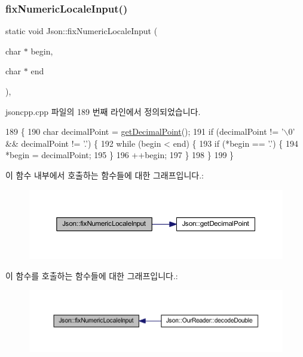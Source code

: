 \subsubsection{\texorpdfstring{fix\+Numeric\+Locale\+Input()}{fixNumericLocaleInput()}}
{\footnotesize\ttfamily static void Json\+::fix\+Numeric\+Locale\+Input (\begin{DoxyParamCaption}\item[{char $\ast$}]{begin,  }\item[{char $\ast$}]{end }\end{DoxyParamCaption})\hspace{0.3cm}{\ttfamily [inline]}, {\ttfamily [static]}}



jsoncpp.\+cpp 파일의 189 번째 라인에서 정의되었습니다.


\begin{DoxyCode}
189                                                                  \{
190   \textcolor{keywordtype}{char} decimalPoint = \hyperlink{namespace_json_ac99d7a5551039dfa712dd1d143c25a16}{getDecimalPoint}();
191   \textcolor{keywordflow}{if} (decimalPoint != \textcolor{charliteral}{'\(\backslash\)0'} && decimalPoint != \textcolor{charliteral}{'.'}) \{
192     \textcolor{keywordflow}{while} (begin < end) \{
193       \textcolor{keywordflow}{if} (*begin == \textcolor{charliteral}{'.'}) \{
194         *begin = decimalPoint;
195       \}
196       ++begin;
197     \}
198   \}
199 \}
\end{DoxyCode}
이 함수 내부에서 호출하는 함수들에 대한 그래프입니다.\+:\nopagebreak
\begin{figure}[H]
\begin{center}
\leavevmode
\includegraphics[width=350pt]{namespace_json_ac142c270507391c8d86f35b550d36eb4_cgraph}
\end{center}
\end{figure}
이 함수를 호출하는 함수들에 대한 그래프입니다.\+:\nopagebreak
\begin{figure}[H]
\begin{center}
\leavevmode
\includegraphics[width=350pt]{namespace_json_ac142c270507391c8d86f35b550d36eb4_icgraph}
\end{center}
\end{figure}
\mbox{\label{namespace_json_ac99d7a5551039dfa712dd1d143c25a16}} 
